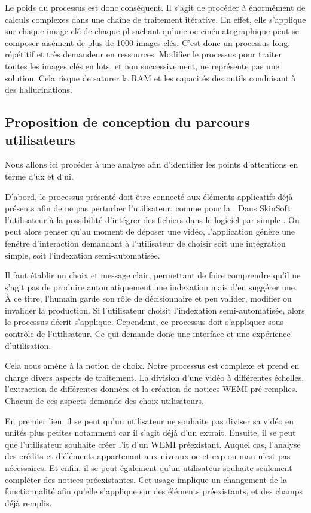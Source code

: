 Le poids du processus est donc conséquent. Il s'agit de procéder à énormément de calculs complexes dans une chaîne de traitement itérative. En effet, elle s'applique sur chaque image clé de chaque \gls{pl} sachant qu'une \gls{oe} cinématographique peut se composer aisément de plus de 1000 images clés. C'est donc un processus long, répétitif et très demandeur en ressources. Modifier le processus pour traiter toutes les images clés en lots, et non successivement, ne représente pas une solution. Cela risque de saturer la \gls{RAM} et les capacités des outils conduisant à des hallucinations. 

\subsection{Proposition de conception du parcours utilisateurs}

Nous allons ici procéder à une analyse afin d'identifier les points d'attentions en terme d'\gls{ux} et d'\gls{ui}.\newline

D'abord, le processus présenté doit être connecté aux éléments applicatifs déjà présents afin de ne pas perturber l'utilisateur, comme pour la . Dans SkinSoft l'utilisateur à la possibilité d'intégrer des fichiers dans le logiciel par simple . On peut alors penser qu'au moment de déposer une vidéo, l'application génère une fenêtre d’interaction demandant à l'utilisateur de choisir soit une intégration simple, soit l'indexation semi-automatisée.

Il faut établir un choix et message clair, permettant de faire comprendre qu'il ne s'agit pas de produire automatiquement une indexation mais d'en suggérer une. À ce titre, l'humain garde son rôle de décisionnaire et peu valider, modifier ou invalider la production. Si l'utilisateur choisit l'indexation semi-automatisée, alors le processus décrit s'applique. Cependant, ce processus doit s'appliquer sous contrôle de l'utilisateur. Ce qui demande donc une interface et une expérience d'utilisation.\newline

Cela nous amène à la notion de choix. Notre processus est complexe et prend en charge divers aspects de traitement. La division d'une vidéo à différentes échelles, l’extraction de différentes données et la création de notices \gls{WEMI} pré-remplies. Chacun de ces aspects demande des choix utilisateurs.

En premier lieu, il se peut qu'un utilisateur ne souhaite pas diviser sa vidéo en unités plus petites notamment car il s'agit déjà d'un extrait. Ensuite, il se peut que l'utilisateur souhaite créer l'\gls{it} d'un \gls{WEMI} préexistant. Auquel cas, l'analyse des crédits et d'éléments appartenant aux niveaux \gls{oe} et \gls{exp} ou \gls{man} n'est pas nécessaires. Et enfin, il se peut également qu'un utilisateur souhaite seulement compléter des notices préexistantes. Cet usage implique un changement de la fonctionnalité afin qu'elle s'applique sur des éléments préexistants, et des champs déjà remplis.\newline

